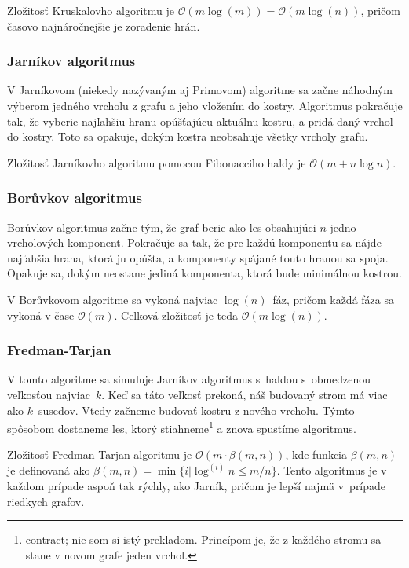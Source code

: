 Zložitosť Kruskalovho algoritmu je $\mathcal{O}(m \log(m))=\mathcal{O}(m \log(n))$, pričom
časovo najnáročnejšie je zoradenie hrán.

\subsubsection{Jarníkov algoritmus}

V Jarníkovom (niekedy nazývaným aj Primovom) algoritme sa začne
náhodným výberom jedného vrcholu z grafu a jeho vložením do kostry.
Algoritmus pokračuje tak, že vyberie najľahšiu hranu opúšťajúcu
aktuálnu kostru, a pridá daný vrchol do kostry. Toto sa opakuje,
dokým kostra neobsahuje všetky vrcholy grafu.

Zložitosť Jarníkovho algoritmu pomocou Fibonacciho haldy
 je $\mathcal{O}(m + n \log n)$.

\subsubsection{Borůvkov algoritmus}

Borůvkov algoritmus začne tým, že graf berie ako les obsahujúci
$n$ jedno-vrcholových komponent. Pokračuje sa tak, že pre každú
komponentu sa nájde najľahšia hrana, ktorá ju opúšťa, a komponenty
spájané touto hranou sa spoja. Opakuje sa, dokým neostane jediná 
komponenta, ktorá bude minimálnou kostrou.

V Borůvkovom algoritme sa vykoná najviac $\log(n)$~fáz, pričom
každá fáza sa vykoná v čase $\mathcal{O}(m)$. Celková zložitosť
je teda $\mathcal{O}(m \log(n))$.

\subsubsection{Fredman-Tarjan}

V tomto algoritme sa simuluje Jarníkov algoritmus s~haldou s~obmedzenou
veľkosťou najviac~$k$. Keď sa táto veľkosť prekoná, náš budovaný strom má 
viac ako $k$~susedov. Vtedy začneme budovať kostru z nového vrcholu. Týmto
spôsobom dostaneme les, ktorý stiahneme\footnote{contract; nie som si istý 
prekladom. Princípom je, že z každého stromu sa stane v novom grafe jeden
vrchol.} a znova spustíme algoritmus.

Zložitosť Fredman-Tarjan algoritmu je $\mathcal{O}(m \cdot \beta(m,n))$, kde
funkcia $\beta(m,n)$ je definovaná ako $\beta(m,n)= \min\{ i | \log^{(i)}n \leq m/n \}$.
Tento algoritmus je v každom prípade aspoň tak rýchly, ako Jarník, pričom
je lepší najmä v~prípade riedkych grafov.

